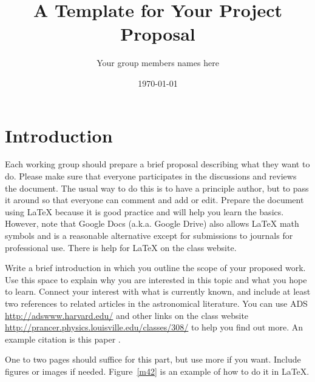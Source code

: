 \documentclass[12pt]{article}
\begin{document}

\title{A Template for Your Project Proposal}
\author{Your group members names here}
\date{\today}



\maketitle


\section{Introduction}


Each working group should prepare a brief proposal describing what they want 
to do.  Please make sure that everyone participates in the discussions and
reviews the document.  The usual way to do this is to have a principle author,
but to pass it around so that everyone can comment and add or edit.  Prepare the
document using \LaTeX\/ because it is good practice and will help you learn the
basics.  However, note that Google Docs (a.k.a. Google Drive) also allows
\LaTeX\/ math symbols and is a reasonable alternative except for submissions
to journals for professional use.  There is help for \LaTeX\/ on the
class website.

Write a brief introduction in which you  outline the scope of your proposed
work. Use this space to explain why you are interested in this topic and what
you hope to learn. Connect your interest with what is currently known, and
include at least two references to related articles in the astronomical
literature.  You can use ADS  \url{http://adswww.harvard.edu/} and other links
on the class website \url{http://prancer.physics.louisville.edu/classes/308/} 
to help you find out more. An example citation is this paper
\cite{Bishop:2006ui}.

One to two pages should suffice for this part, but use more if you want.  
Include figures or images if needed.  Figure~\ref{m42} is an example of  how to
do it in \LaTeX.
\end{document}
